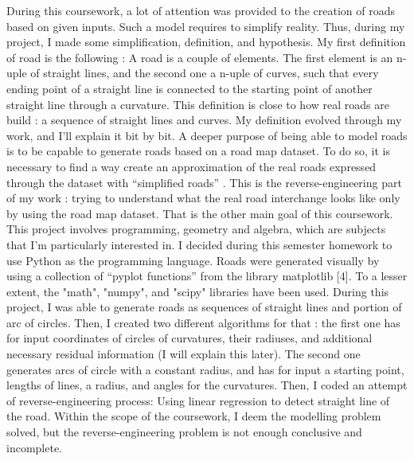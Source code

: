 
During this coursework, a lot of attention was provided to the creation of roads based on given inputs. Such a model requires to simplify reality. Thus, during my project, I made some simplification, definition, and hypothesis. My first definition of road is the following : A road is a couple of elements. The first element is an n-uple of straight lines, and the second one a n-uple of curves, such that every ending point of a straight line is connected to the starting point of another straight line through a curvature. This definition is close to how real roads are build : a sequence of straight lines and curves. My definition evolved through my work, and I’ll explain it bit by bit.
\newline
\newline
A deeper purpose of being able to model roads is to be capable to generate roads based on a road map dataset. To do so, it is necessary to find a way create an approximation of the real roads expressed through the dataset with “simplified roads” . This is the reverse-engineering part of my work : trying to understand what the real road interchange looks like only by using the road map dataset. That is the other main goal of this coursework.
\newline
\newline
This project involves programming, geometry and algebra, which are subjects that I’m particularly interested in. I decided during this semester homework to use Python as the programming language. Roads were generated visually by using a collection of “pyplot  functions” from the library matplotlib [4]. To a lesser extent, the  "math", "numpy", and "scipy" libraries have been used. During this project, I was able to generate roads as sequences of straight lines and portion of arc of circles. Then, I created two different algorithms for that : the first one has for input coordinates of circles of curvatures, their radiuses, and additional necessary residual information (I will explain this later). The second one generates arcs of circle with a constant radius, and has for input a starting point, lengths of lines, a radius, and angles for the curvatures. Then, I coded an attempt of reverse-engineering process: Using linear regression to detect straight line of the road. Within the scope of the coursework, I deem the modelling problem solved, but the reverse-engineering problem is not enough conclusive and incomplete.